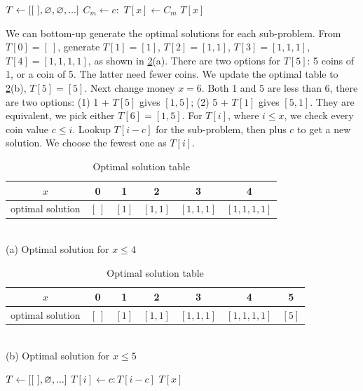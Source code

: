 \documentclass[b5paper]{article}
\begin{document}
\begin{algorithmic}[1]
\State $T \gets [[\ ], \varnothing, \varnothing, ...]$ 
      \State $C_m \gets c :$ 
        \State $T[x] \gets C_m$
      \EndIf
    \EndFor
  \EndIf
  \State \Return $T[x]$
\EndFunction
\end{algorithmic}

We can bottom-up generate the optimal solutions for each sub-problem. From $T[0] = [\ ]$, generate $T[1] = [1]$, $T[2] = [1, 1]$, $T[3] = [1, 1, 1]$, $T[4] = [1, 1, 1, 1]$, as shown in \cref{tab:change-money}(a). There are two options for $T[5]$: 5 coins of 1, or a coin of 5. The latter need fewer coins. We update the optimal table to \cref{tab:change-money}(b), $T[5] = [5]$. Next change money $x = 6$. Both 1 and 5 are less than 6, there are two options: (1) 1 + $T[5]$ gives $[1, 5]$; (2) 5 + $T[1]$ gives $[5, 1]$. They are equivalent, we pick either $T[6] = [1, 5]$. For $T[i]$, where $i \leq x$, we check every coin value $c \leq i$. Lookup $T[i - c]$ for the sub-problem, then plus $c$ to get a new solution. We choose the fewest one as $T[i]$.

\begin{table}[htbp]
\centering
\begin{tabular}{|c||c|c|c|c|c|}
\hline
$x$ & 0 & 1 & 2 & 3 & 4 \\
\hline
optimal solution & $[\ ]$ & $[1]$ & $[1, 1]$ & $[1, 1, 1]$ & $[1, 1, 1, 1]$ \\
\hline
\end{tabular} \\
(a) Optimal solution for $x \leq 4$ \\
\vspace{10pt}
\begin{tabular}{c||c|c|c|c|c|c|}
\hline
$x$ & 0 & 1 & 2 & 3 & 4 & 5 \\
\hline
optimal solution & $[\ ]$ & $[1]$ & $[1, 1]$ & $[1, 1, 1]$ & $[1, 1, 1, 1]$ & $[5]$ \\
\hline
\end{tabular} \\
(b) Optimal solution for $x \leq 5$ \\
\caption{Optimal solution table}
\label{tab:change-money}
\end{table}

\begin{algorithmic}[1]
  \State $T \gets [[\ ], \varnothing, ... ]$
        \State $T[i] \gets  c : T[i-c]$
      \EndIf
    \EndFor
  \EndFor
  \State \Return $T[x]$
\EndFunction
\end{algorithmic}
\end{document}
